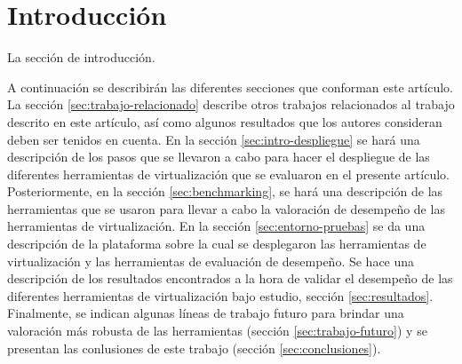 \section{Introducción}
La sección de introducción.

A continuación se describirán las diferentes secciones que conforman este artículo.
La sección \ref{sec:trabajo-relacionado} describe otros trabajos relacionados al trabajo descrito en este artículo, así como algunos resultados que los autores consideran deben ser tenidos en cuenta.
En la sección \ref{sec:intro-despliegue} se hará una descripción de los pasos que se llevaron a cabo para hacer el despliegue de las diferentes herramientas de virtualización que se evaluaron en el presente artículo.
Posteriormente, en la sección \ref{sec:benchmarking}, se hará una descripción de las herramientas que se usaron para llevar a cabo la valoración de desempeño de las herramientas de virtualización.
En la sección \ref{sec:entorno-pruebas} se da una descripción de la plataforma sobre la cual se desplegaron las herramientas de virtualización y las herramientas de evaluación de desempeño.
Se hace una descripción de los resultados encontrados a la hora de validar el desempeño de las diferentes herramientas de virtualización bajo estudio, sección \ref{sec:resultados}.
Finalmente, se indican algunas líneas de trabajo futuro para brindar una valoración más robusta de las herramientas (sección \ref{sec:trabajo-futuro}) y se presentan las conlusiones de este trabajo (sección \ref{sec:conclusiones}).

